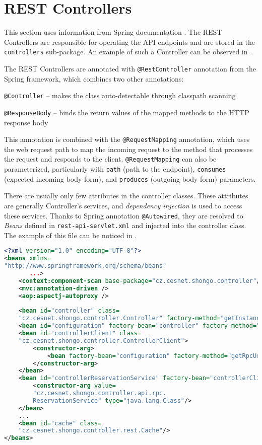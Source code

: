 \section{REST Controllers}
This section uses information from Spring documentation \cite{springdocumentation}.
The REST Controllers are responsible for operating the API endpoints and are stored in the \texttt{controllers} sub-package. An example of such a Controller can be observed in .

The REST Controllers are annotated with \texttt{@RestController} annotation from the Spring framework, which combines two other annotations:
\begin{description}
    \item \texttt{@Controller} -- makes the class auto-detectable through classpath scanning
    \item \texttt{@ResponseBody} -- binds the return values of the mapped methods to the HTTP response body
\end{description}
This annotation is combined with the \texttt{@RequestMapping} annotation, which uses the web request path to map the incoming request to the method that processes the request and responds to the client. \texttt{@RequestMapping} can also be parameterized, particularly with \texttt{path} (path to the endpoint), \texttt{consumes} (expected incoming body form), and \texttt{produces} (outgoing body form) parameters.

There are usually only few attributes in the controller classes. These attributes are generally Controller’s services, and \emph{dependency injection} is used to access these services. Thanks to Spring annotation \texttt{@Autowired}, they are resolved to \emph{Beans} defined in \texttt{rest-api-servlet.xml} and injected into the controller class. The example of this file can be noticed in .

\begin{lstlisting}[language=XML, caption=rest-api-servlet.xml, label=lst:beans]
<?xml version="1.0" encoding="UTF-8"?>
<beans xmlns=
"http://www.springframework.org/schema/beans"
       ...>
    <context:component-scan base-package="cz.cesnet.shongo.controller"/>
    <mvc:annotation-driven />
    <aop:aspectj-autoproxy />
    
    <bean id="controller" class=
    "cz.cesnet.shongo.controller.Controller" factory-method="getInstance"/>
    <bean id="configuration" factory-bean="controller" factory-method="getConfiguration"/>
    <bean id="controllerClient" class=
    "cz.cesnet.shongo.controller.ControllerClient">
        <constructor-arg>
            <bean factory-bean="configuration" factory-method="getRpcUrl"/>
        </constructor-arg>
    </bean>
    <bean id="controllerReservationService" factory-bean="controllerClient" factory-method="getService">
        <constructor-arg value=
        "cz.cesnet.shongo.controller.api.rpc.
        ReservationService" type="java.lang.Class"/>
    </bean>
    ...
    <bean id="cache" class=
    "cz.cesnet.shongo.controller.rest.Cache"/>
</beans>
\end{lstlisting}

